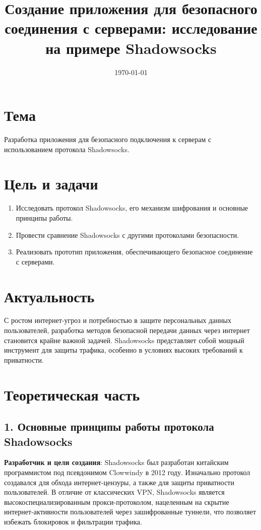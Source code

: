 \documentclass[a4paper,12pt]{article}
\begin{document}
\title{Создание приложения для безопасного соединения с серверами: исследование на примере Shadowsocks}
\date{\today}
\maketitle

\section*{Тема}

Разработка приложения для безопасного подключения к серверам с использованием протокола Shadowsocks.

\section*{Цель и задачи}

\begin{enumerate}
    \item Исследовать протокол Shadowsocks, его механизм шифрования и основные принципы работы.
    \item Провести сравнение Shadowsocks с другими протоколами безопасности.
    \item Реализовать прототип приложения, обеспечивающего безопасное соединение с серверами.
\end{enumerate}

\section*{Актуальность}

С ростом интернет-угроз и потребностью в защите персональных данных пользователей, разработка методов безопасной передачи данных через интернет становится крайне важной задачей. Shadowsocks представляет собой мощный инструмент для защиты трафика, особенно в условиях высоких требований к приватности.

\newpage

\section*{Теоретическая часть}

\subsection*{1. Основные принципы работы протокола Shadowsocks}

\textbf{Разработчик и цели создания}: Shadowsocks был разработан китайским программистом под псевдонимом Clowwindy в 2012 году. Изначально протокол создавался для обхода интернет-цензуры, а также для защиты приватности пользователей. В отличие от классических VPN, Shadowsocks является высокоспециализированным прокси-протоколом, нацеленным на скрытие интернет-активности пользователей через зашифрованные туннели, что позволяет избежать блокировок и фильтрации трафика.
\end{document}

